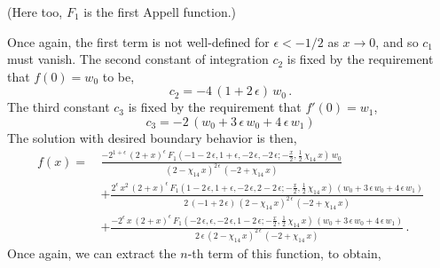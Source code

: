 \documentclass[aps,prd,preprint,groupedaddress,nofootinbib,showpacs,eqsecnum]{revtex4}
\def\eps{\epsilon}
\begin{document}
(Here too, $F_1$ is the first Appell function.)

Once again, the first term is not well-defined for $\eps<-1/2$ as $x\rightarrow 0$,
and so $c_1$ must vanish.  The second constant of integration $c_2$ is
fixed by the requirement that $f(0) = w_0$ to be,
\begin{equation}
c_2 = -4\,(1+2\,\eps)\,w_0\,.
\end{equation}
The third constant $c_3$ is fixed by the requirement that $f'(0) = w_1$,
\begin{equation}
c_3 = -2\,(w_0+3\,\eps\,w_0+4\,\eps\,w_1)
\end{equation}
The solution with desired boundary behavior is then,
\begin{equation}
\begin{aligned}
f(x) = \,&
\frac{-2^{1+\eps}\,(2+x)^{\eps}
	\,F_1(-1-2\,\eps,1+\eps,-2\,\eps,-2\,\eps;
	-\frac{x}{2},\frac{1}{2}\,\chi_{14}\,x)\,w_0}
{(2-\chi_{14}\,x)^{2\,\eps}\,(-2+\chi_{14}\,x)}
\\&
+\frac{2^{\eps}\,x^{2}\,(2+x)^{\eps}
	\,F_1(1-2\,\eps,1+\eps,-2\,\eps,2-2\,\eps;
	-\frac{x}{2},\frac{1}{2}\,\chi_{14}\,x)\,(w_0+3\,\eps\,w_0+4\,\eps\,w_1)}
{2\,(-1+2\,\eps)\,(2-\chi_{14}\,x)^{2\,\eps}\,(-2+\chi_{14}\,x)}
\\ &
+\frac{-2^{\eps}\,x\,(2+x)^{\eps}
	\,F_1(-2\,\eps,\eps,-2\,\eps,1-2\,\eps;
	-\frac{x}{2},\frac{1}{2}\,\chi_{14}\,x)\,(w_0+3\,\eps\,w_0+4\,\eps\,w_1)}
{2\,\eps\,(2-\chi_{14}\,x)^{2\,\eps}\,(-2+\chi_{14}\,x)}
\,.
\end{aligned}
\end{equation}
Once again, we can extract the $n$-th term of this function, to obtain,
\end{document}
